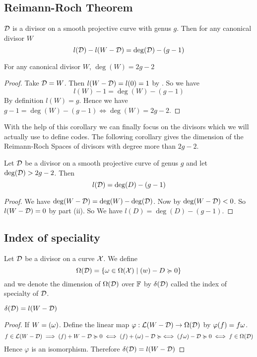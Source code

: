 \subsection{Reimann-Roch Theorem}

\begin{theorem}
	$\mathcal{D}$ is a divisor on a smooth projective curve with genus $g$. Then for any canonical divisor $W$ $$l(\mathcal{D}) - l(W-\mathcal{D})= \deg(\mathcal{D})- (g-1)$$
\end{theorem}
\begin{corollary}\label{candivdeg}
	For any canonical divisor $W$,  $\deg(W)=2g-2$
\end{corollary}
\begin{proof}
	Take $\mathcal{D}=W$. Then $l(W-\mathcal{D})=l(0)=1$ by . So we have $$l(W)-1=\deg(W)-(g-1)$$ By definition $l(W)=g$. Hence we have $g-1=\deg(W)-(g-1)\iff \deg(W)=2g-2$.
\end{proof}
With the help of this corollary we can finally focus on the divisors which we will actually use to define codes. The following corollary gives the dimension of the Reimann-Roch Spaces of divisors with degree more than $2g-2$.
\begin{corollary}\label{divdimdeg}
	Let $\mathcal{D}$ be a divisor on a smooth projective curve of genus $g$ and let $\deg(\mathcal{D})>2g-2$. Then $$l(\mathcal{D})=\deg(D)-(g-1)$$
\end{corollary}
\begin{proof}
	We have $\deg(W-\mathcal{D})=\deg(W)-\deg(\mathcal{D})$. Now by  $\deg(W-\mathcal{D})<0$. So  $l(W-\mathcal{D})=0$ by  part (ii). So We have $l(D)=\deg(D)-(g-1)$.
\end{proof}
\subsection{Index of speciality}
\begin{definition}
	Let $\mathcal{D}$ be a divisor on a curve $\mathcal{X}$. We define $$\Omega(\mathcal{D})=\{\omega\in \Omega(\mathcal{X})\mid (w)-D\succcurlyeq 0\}$$ and we denote the dimension of $\Omega(\mathcal{D})$ over $\mathbb{F}$ by $\delta(\mathcal{D})$ called the index of specialty of $\mathcal{D}$.
\end{definition}
\begin{theorem}
	$\delta(\mathcal{D})=l(W-\mathcal{D})$
\end{theorem}
\begin{proof}
	If $W=(\omega)$. Define the linear map $\varphi:\mathcal{L}(W-\mathcal{D})\to \Omega(\mathcal{D})$ by $\varphi(f)=f\omega$. $$f\in \mathcal{L}(W-\mathcal{D})\implies (f)+W-\mathcal{D}\succcurlyeq 0 \iff (f)+(\omega)-\mathcal{D}\succcurlyeq \iff (f\omega)-\mathcal{D}\succcurlyeq0\iff f\in \Omega(\mathcal{D})$$Hence $\varphi$ is an isomorphism. Therefore $\delta(\mathcal{D})=l(W-\mathcal{D})$
\end{proof}